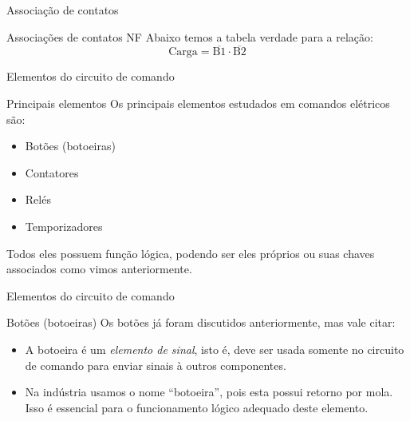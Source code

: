 \begin{frame}{Associação de contatos}
\begin{block}{Associações de contatos NF}
Abaixo temos a tabela verdade para a relação:
$$ \text{Carga} = \overline{\text{B}1}\cdot\overline{\text{B}2} $$
\end{block}

\vspace{0.3cm}

\begin{table}[h]
\end{table}
\end{frame}


\begin{frame}{Elementos do circuito de comando}
\begin{block}{Principais elementos}
	Os principais elementos estudados em comandos elétricos são:
	\begin{itemize}
		\item Botões (botoeiras)
		\item Contatores
		\item Relés
		\item Temporizadores
	\end{itemize}
	Todos eles possuem função lógica, podendo ser eles próprios ou suas chaves associados como vimos anteriormente.
\end{block}
\end{frame}


\begin{frame}{Elementos do circuito de comando}
\begin{block}{Botões (botoeiras)}
	Os botões já foram discutidos anteriormente, mas vale citar:
	\begin{itemize}
		\item A botoeira é um \textit{elemento de sinal}, isto é, deve ser usada somente no circuito de comando para enviar sinais à outros componentes.
		\item Na indústria usamos o nome ``botoeira'', pois esta possui retorno por mola. Isso é essencial para o funcionamento lógico adequado deste elemento. 
	\end{itemize}
\end{block}
\end{frame}


